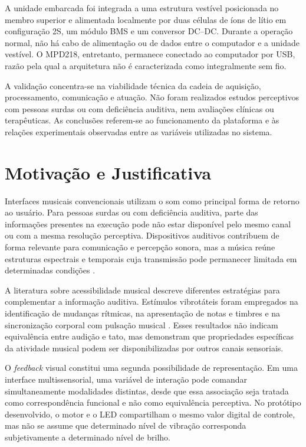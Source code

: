 A unidade embarcada foi integrada a uma estrutura vestível posicionada no membro superior e alimentada localmente por duas células de íons de lítio em configuração 2S, um módulo BMS e um conversor DC--DC. Durante a operação normal, não há cabo de alimentação ou de dados entre o computador e a unidade vestível. O MPD218, entretanto, permanece conectado ao computador por USB, razão pela qual a arquitetura não é caracterizada como integralmente sem fio.

A validação concentra-se na viabilidade técnica da cadeia de aquisição, processamento, comunicação e atuação. Não foram realizados estudos perceptivos com pessoas surdas ou com deficiência auditiva, nem avaliações clínicas ou terapêuticas. As conclusões referem-se ao funcionamento da plataforma e às relações experimentais observadas entre as variáveis utilizadas no sistema.

\section{Motivação e Justificativa}

Interfaces musicais convencionais utilizam o som como principal forma de retorno ao usuário. Para pessoas surdas ou com deficiência auditiva, parte das informações presentes na execução pode não estar disponível pelo mesmo canal ou com a mesma resolução perceptiva. Dispositivos auditivos contribuem de forma relevante para comunicação e percepção sonora, mas a música reúne estruturas espectrais e temporais cuja transmissão pode permanecer limitada em determinadas condições \cite{fletcher2021}.

A literatura sobre acessibilidade musical descreve diferentes estratégias para complementar a informação auditiva. Estímulos vibrotáteis foram empregados na identificação de mudanças rítmicas, na apresentação de notas e timbres e na sincronização corporal com pulsação musical \cite{darrowgoll1989,hopkins2016,russo2012,tranchant2017}. Esses resultados não indicam equivalência entre audição e tato, mas demonstram que propriedades específicas da atividade musical podem ser disponibilizadas por outros canais sensoriais.

O \textit{feedback} visual constitui uma segunda possibilidade de representação. Em uma interface multissensorial, uma variável de interação pode comandar simultaneamente modalidades distintas, desde que essa associação seja tratada como correspondência funcional e não como equivalência perceptiva. No protótipo desenvolvido, o motor e o LED compartilham o mesmo valor digital de controle, mas não se assume que determinado nível de vibração corresponda subjetivamente a determinado nível de brilho.

